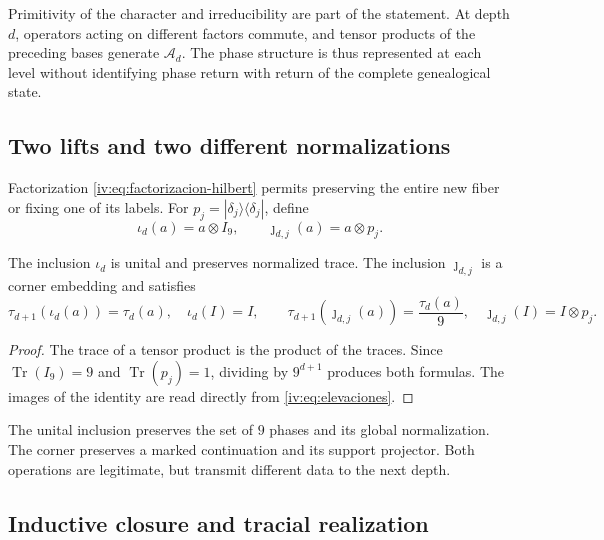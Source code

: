 Primitivity of the character and irreducibility are part of the
statement. At depth \(d\), operators acting on different
factors commute, and tensor products of the preceding bases
generate \(\mathcal A_d\). The phase structure is thus
represented at each level without identifying phase return with
return of the complete genealogical state.

\subsection{Two lifts and two different normalizations}

Factorization \eqref{iv:eq:factorizacion-hilbert} permits preserving
the entire new fiber or fixing one of its labels. For
\(p_j=|\delta_j\rangle\langle\delta_j|\), define
\begin{equation}
 \iota_d(a)=a\otimes I_9,
 \qquad \jmath_{d,j}(a)=a\otimes p_j.
 \label{iv:eq:elevaciones}
\end{equation}
\begin{proposition}
\label{iv:prop:unidad-traza}
The inclusion \(\iota_d\) is unital and preserves normalized trace.
The inclusion \(\jmath_{d,j}\) is a corner embedding and
satisfies
\[
 \tau_{d+1}(\iota_d(a))=\tau_d(a),\quad \iota_d(I)=I,
 \qquad
 \tau_{d+1}(\jmath_{d,j}(a))=\frac{\tau_d(a)}9,
 \quad \jmath_{d,j}(I)=I\otimes p_j.
\]
\end{proposition}
\begin{proof}
The trace of a tensor product is the product of the traces.
Since \(\operatorname{Tr}(I_9)=9\) and
\(\operatorname{Tr}(p_j)=1\), dividing by \(9^{d+1}\)
produces both formulas. The images of the identity are read
directly from \eqref{iv:eq:elevaciones}.
\end{proof}

The unital inclusion preserves the set of \(9\) phases and its
global normalization. The corner preserves a marked continuation and
its support projector. Both operations are legitimate, but
transmit different data to the next depth.

\subsection{Inductive closure and tracial realization}

